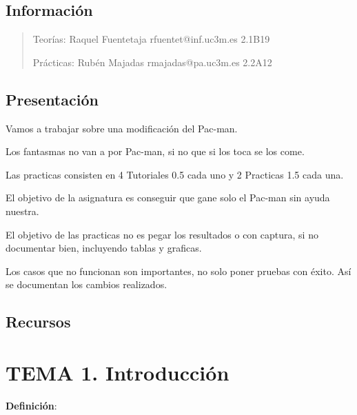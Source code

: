 \documentclass[12pt]{report} %
\begin{document}
\listoffigures
\thispagestyle{fancy}

\listoftables
\thispagestyle{fancy}

\clearpage
{} %




\section{Información}

\begin{quote}
Teorías: Raquel Fuentetaja rfuentet@inf.uc3m.es 2.1B19

Prácticas: Rubén Majadas rmajadas@pa.uc3m.es 2.2A12
\end{quote}

\section{Presentación}

Vamos a trabajar sobre una modificación del Pac-man.

Los fantasmas no van a por Pac-man, si no que si los toca se los come.

Las practicas consisten en 4 Tutoriales 0.5 cada uno y 2 Practicas 1.5
cada una.

El objetivo de la asignatura es conseguir que gane solo el Pac-man sin
ayuda nuestra.

El objetivo de las practicas no es pegar los resultados o con captura,
si no documentar bien, incluyendo tablas y graficas.

Los casos que no funcionan son importantes, no solo poner pruebas con
éxito. Así se documentan los cambios realizados.

\section{Recursos}

\chapter{TEMA 1. Introducción}

\textbf{Definición}:
\end{document}
